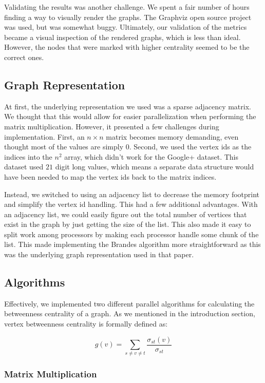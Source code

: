 \documentclass[11pt,a4paper,titlepage]{article}
\begin{document}
Validating the results was another challenge. We spent a fair number of hours
finding a way to visually render the graphs. The Graphviz open source project
was used, but was somewhat buggy. Ultimately, our validation of the metrics
became a visual inspection of the rendered graphs, which is less than ideal.
However, the nodes that were marked with higher centrality seemed to be the
correct ones.


\subsection{Graph Representation}

At first, the underlying representation we used was a sparse adjacency matrix.
We thought that this would allow for easier parallelization when performing the
matrix multiplication. However, it presented a few challenges during
implementation. First, an $n \times n$ matrix becomes memory demanding, even
thought most of the values are simply $0$. Second, we used the vertex ids as
the indices into the $n^2$ array, which didn't work for the Google+ dataset.
This dataset used $21$ digit long values, which means a separate data structure
would have been needed to map the vertex ids back to the matrix indices.

Instead, we switched to using an adjacency list to decrease the memory
footprint and simplify the vertex id handling. This had a few additional
advantages. With an adjacency list, we could easily figure out the total number
of vertices that exist in the graph by just getting the size of the list. This
also made it easy to split work among processors by making each processor
handle some chunk of the list. This made implementing the Brandes algorithm
more straightforward as this was the underlying graph representation used in
that paper.


\subsection{Algorithms}

Effectively, we implemented two different parallel algorithms for calculating
the betweenness centrality of a graph. As we mentioned in the introduction
section, vertex betweenness centrality is formally defined as:

\[ g(v) = \sum_{s \neq v \neq t}{\frac{\sigma_{st}(v)}{\sigma_{st}}} \]

\subsubsection{Matrix Multiplication}
\end{document}
